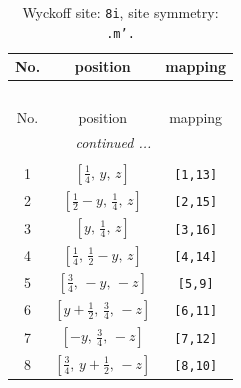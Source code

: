 \documentclass[fleqn,8pt]{jsarticle}
\begin{document}
\begin{longtable}{ccc}
\caption{Wyckoff site: {\tt 8i}, site symmetry: {\tt .m'.}}
 \\
 \hline \hline
No. & position & mapping \\ \hline \endfirsthead

\multicolumn{2}{l}{\tablename\ \thetable{}} \\
 \hline \hline
No. & position & mapping \\ \hline \endhead

 \hline \hline
\multicolumn{2}{r}{\footnotesize\it continued ...} \\ \endfoot

 \hline \hline
\multicolumn{2}{r}{} \\ \endlastfoot

1 & $\left[ \frac{1}{4},\, y,\, z \right]$ & {\tt [1,13]} \\ \hline
2 & $\left[ \frac{1}{2} - y,\, \frac{1}{4},\, z \right]$ & {\tt [2,15]} \\ \hline
3 & $\left[ y,\, \frac{1}{4},\, z \right]$ & {\tt [3,16]} \\ \hline
4 & $\left[ \frac{1}{4},\, \frac{1}{2} - y,\, z \right]$ & {\tt [4,14]} \\ \hline
5 & $\left[ \frac{3}{4},\, - y,\, - z \right]$ & {\tt [5,9]} \\ \hline
6 & $\left[ y + \frac{1}{2},\, \frac{3}{4},\, - z \right]$ & {\tt [6,11]} \\ \hline
7 & $\left[ - y,\, \frac{3}{4},\, - z \right]$ & {\tt [7,12]} \\ \hline
8 & $\left[ \frac{3}{4},\, y + \frac{1}{2},\, - z \right]$ & {\tt [8,10]} \\
\end{longtable}
\renewcommand{\arraystretch}{1.2}
\end{document}
